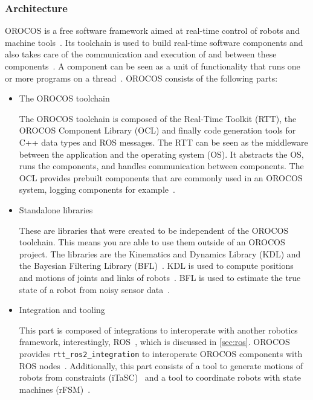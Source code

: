 \documentclass[a4paper]{book}
\begin{document}
\subsubsection{Architecture}
OROCOS is a free software framework aimed at real-time control of robots and
machine tools~\cite{orocos_history}. Its toolchain is used to build real-time
software components and also takes care of the communication and execution
of and between these components~\cite{orocos_rtt_manual}.
A component can be seen as a unit of functionality
that runs one or more programs on a thread~\cite{orocos_rtt_manual}. OROCOS
consists of the following parts:
\begin{itemize}
	\item The OROCOS toolchain
        \par
        The OROCOS toolchain is composed of the Real-Time Toolkit (RTT), the
        OROCOS Component Library (OCL) and finally code generation tools for C++
        data types and ROS messages. The RTT can be seen as the middleware
        between the application and the operating system (OS). It abstracts the
        OS, runs the components, and handles communication between components.
        The OCL provides prebuilt components that are commonly used in an OROCOS
        system, logging components for example~\cite{orocos_rtt_manual}.
	\item Standalone libraries
        \par
        These are libraries that were created to be independent of the OROCOS
        toolchain. This means you are able to use them outside of an OROCOS
        project. The libraries are the Kinematics and Dynamics Library (KDL) and
        the Bayesian Filtering Library (BFL)~\cite{orocos_history}. KDL is used
        to compute positions and motions of joints and links of
        robots~\cite{orocos_kdl}. BFL is used to estimate the true state of a
        robot from noisy sensor data~\cite{orocos_bfl}.
	\item Integration and tooling
        \par
        This part is composed of integrations to interoperate with another
        robotics framework, interestingly, ROS~\cite{orocos_rtt_ros,
        orocos_rtt_ros2}, which is discussed in \cref{sec:ros}. OROCOS provides
        \texttt{rtt\_ros2\_integration} to interoperate OROCOS components with
        ROS nodes~\cite{orocos_rtt_ros2}. Additionally, this part consists of a
        tool to generate motions of robots from constraints
        (iTaSC)~\cite{orocos_itasc} and a tool to coordinate robots with state
        machines (rFSM)~\cite{orocos_rfsm}.
\end{itemize}
\end{document}
